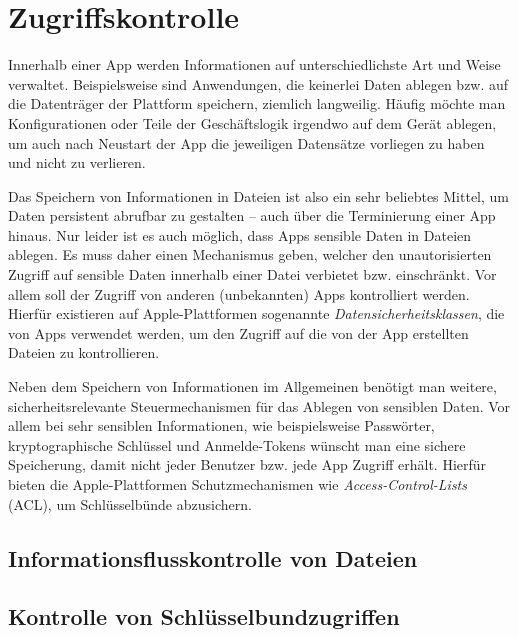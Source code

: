 \section{Zugriffskontrolle}
Innerhalb einer App werden Informationen auf unterschiedlichste Art und Weise
verwaltet. Beispielsweise sind Anwendungen, die keinerlei Daten ablegen bzw. auf
die Datenträger der Plattform speichern, ziemlich langweilig. Häufig möchte man
Konfigurationen oder Teile der Geschäftslogik irgendwo auf dem Gerät ablegen, um
auch nach Neustart der App die jeweiligen Datensätze vorliegen zu haben und
nicht zu verlieren.

Das Speichern von Informationen in Dateien ist also ein sehr beliebtes Mittel,
um Daten persistent abrufbar zu gestalten -- auch über die Terminierung einer
App hinaus. Nur leider ist es auch möglich, dass Apps sensible Daten in Dateien
ablegen.  Es muss daher einen Mechanismus geben, welcher den unautorisierten
Zugriff auf sensible Daten innerhalb einer Datei verbietet bzw.  einschränkt.
Vor allem soll der Zugriff von anderen (unbekannten) Apps kontrolliert werden.
Hierfür existieren auf Apple-Plattformen sogenannte
\textit{Datensicherheitsklassen}, die von Apps verwendet werden, um den Zugriff
auf die von der App erstellten Dateien zu kontrollieren.

Neben dem Speichern von Informationen im Allgemeinen benötigt man weitere,
sicherheitsrelevante Steuermechanismen für das Ablegen von sensiblen Daten. Vor
allem bei sehr sensiblen Informationen, wie beispielsweise Passwörter,
kryptographische Schlüssel und Anmelde-Tokens wünscht man eine sichere
Speicherung, damit nicht jeder Benutzer bzw. jede App Zugriff erhält. Hierfür
bieten die Apple-Plattformen Schutzmechanismen wie \textit{Access-Control-Lists}
(ACL), um Schlüsselbünde abzusichern.

\subsection{Informationsflusskontrolle von Dateien}


\subsection{Kontrolle von Schlüsselbundzugriffen}
